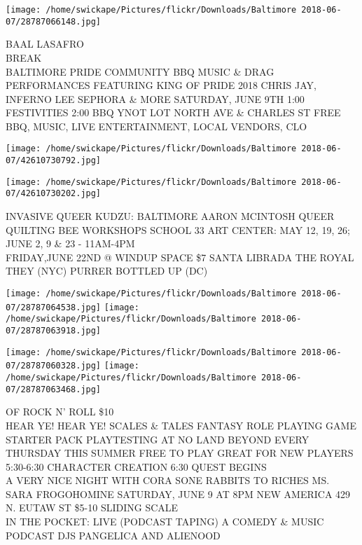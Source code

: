 \documentclass[10pt,letterpaper]{article}
\begin{document}
\vspace{0.25in}
\texttt{[image: /home/swickape/Pictures/flickr/Downloads/Baltimore 2018-06-07/28787066148.jpg]}

BAAL LASAFRO\\
BREAK\\
BALTIMORE PRIDE COMMUNITY BBQ MUSIC \& DRAG PERFORMANCES FEATURING KING OF PRIDE 2018 CHRIS JAY, INFERNO LEE SEPHORA \& MORE SATURDAY, JUNE 9TH 1:00 FESTIVITIES 2:00 BBQ YNOT LOT NORTH AVE \& CHARLES ST FREE BBQ, MUSIC, LIVE ENTERTAINMENT, LOCAL VENDORS, CLO\\
\pagebreak

\texttt{[image: /home/swickape/Pictures/flickr/Downloads/Baltimore 2018-06-07/42610730792.jpg]}

\vspace{0.25in}
\texttt{[image: /home/swickape/Pictures/flickr/Downloads/Baltimore 2018-06-07/42610730202.jpg]}

INVASIVE QUEER KUDZU: BALTIMORE AARON MCINTOSH QUEER QUILTING BEE WORKSHOPS SCHOOL 33 ART CENTER: MAY 12, 19, 26; JUNE 2, 9 \& 23 {-} 11AM{-}4PM\\
FRIDAY,JUNE 22ND @ WINDUP SPACE \$7 SANTA LIBRADA THE ROYAL THEY (NYC) PURRER BOTTLED UP (DC)\\
\pagebreak

\texttt{[image: /home/swickape/Pictures/flickr/Downloads/Baltimore 2018-06-07/28787064538.jpg]}
\texttt{[image: /home/swickape/Pictures/flickr/Downloads/Baltimore 2018-06-07/28787063918.jpg]}

\texttt{[image: /home/swickape/Pictures/flickr/Downloads/Baltimore 2018-06-07/28787060328.jpg]}
\texttt{[image: /home/swickape/Pictures/flickr/Downloads/Baltimore 2018-06-07/28787063468.jpg]}

OF ROCK N' ROLL \$10\\
HEAR YE!  HEAR YE!  SCALES \& TALES FANTASY ROLE PLAYING GAME STARTER PACK PLAYTESTING AT NO LAND BEYOND EVERY THURSDAY THIS SUMMER FREE TO PLAY GREAT FOR NEW PLAYERS 5:30{-}6:30 CHARACTER CREATION 6:30 QUEST BEGINS\\
A VERY NICE NIGHT WITH CORA SONE RABBITS TO RICHES MS. SARA FROGOHOMINE SATURDAY, JUNE 9 AT 8PM NEW AMERICA 429 N. EUTAW ST \$5{-}10 SLIDING SCALE\\
IN THE POCKET: LIVE (PODCAST TAPING) A COMEDY \& MUSIC PODCAST DJS PANGELICA AND ALIENOOD\\
\pagebreak
\end{document}
